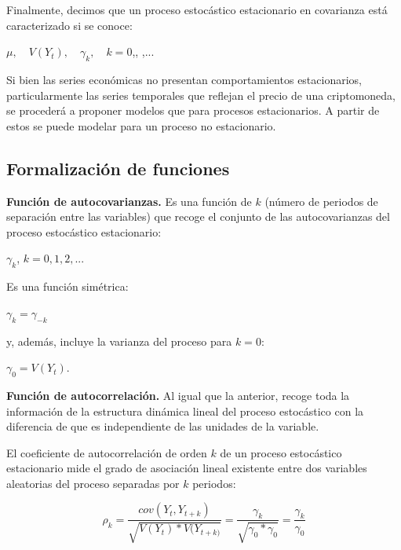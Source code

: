 \documentclass[a4paper,10pt]{article}
\begin{document}
Finalmente, decimos que un proceso estocástico estacionario en covarianza está caracterizado si se conoce:

\begin{center}
$\mu, \quad V(Y_t), \quad \gamma_k, \quad k=0$,, ,...
\end{center}

Si bien las series económicas no presentan comportamientos estacionarios, particularmente las series temporales que reflejan el precio de una criptomoneda, se procederá a proponer modelos que para procesos estacionarios. A partir de estos se puede modelar para un proceso no estacionario.

\subsection{Formalización de funciones}

\textbf{Función de autocovarianzas.} Es una función de $k$ (número
de periodos de separación entre las variables) que recoge el conjunto de las autocovarianzas del proceso estocástico estacionario:

\begin{center}
$\gamma_k$, $k=0,1,2,...$
\end{center}

Es una función simétrica:

\begin{center}
$\gamma_k = \gamma_{-k}$
\end{center}

y, además, incluye la varianza del proceso para $k=0$:

\begin{center}
$\gamma_0 = V(Y_t)$.
\end{center}

\textbf{Función de autocorrelación.} Al igual que la anterior, recoge toda la información de la estructura dinámica lineal del proceso estocástico con la diferencia de que es independiente de las unidades de la variable.

El coeficiente de autocorrelación de orden $k$ de un proceso estocástico estacionario mide el grado de asociación lineal existente entre dos variables aleatorias del proceso separadas por $k$ periodos:

\begin{equation}
\rho_k = \frac{cov(Y_t, Y_{t+k})}{\sqrt{V(Y_t)*V(Y_{t+k)}}} = \frac{\gamma_k}{\sqrt{\gamma_0 * \gamma_0}} = \frac{\gamma_k}{\gamma_0}
\end{equation}
\end{document}
